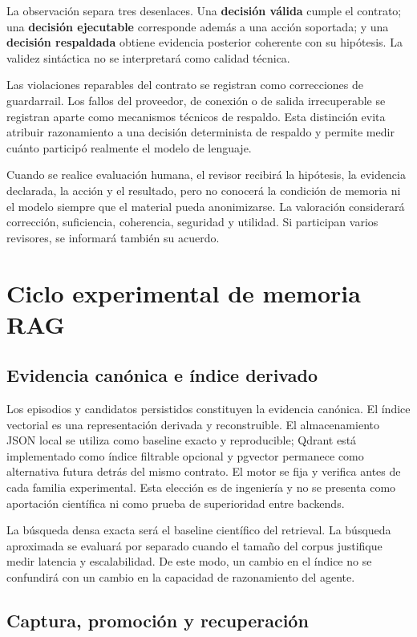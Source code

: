 La observación separa tres desenlaces. Una \textbf{decisión válida} cumple el
contrato; una \textbf{decisión ejecutable} corresponde además a una acción
soportada; y una \textbf{decisión respaldada} obtiene evidencia posterior
coherente con su hipótesis. La validez sintáctica no se interpretará como calidad
técnica.

Las violaciones reparables del contrato se registran como correcciones de
guardarrail. Los fallos del proveedor, de conexión o de salida irrecuperable se
        registran aparte como mecanismos técnicos de respaldo. Esta distinción evita atribuir
razonamiento a una decisión determinista de respaldo y permite medir cuánto
participó realmente el modelo de lenguaje.

Cuando se realice evaluación humana, el revisor recibirá la hipótesis, la
evidencia declarada, la acción y el resultado, pero no conocerá la condición de
memoria ni el modelo siempre que el material pueda anonimizarse. La valoración
considerará corrección, suficiencia, coherencia, seguridad y utilidad. Si
participan varios revisores, se informará también su acuerdo.

\section{Ciclo experimental de memoria RAG}

\subsection{Evidencia canónica e índice derivado}

Los episodios y candidatos persistidos constituyen la evidencia canónica. El
índice vectorial es una representación derivada y reconstruible. El
almacenamiento JSON local se utiliza como baseline exacto y reproducible;
Qdrant está implementado como índice filtrable opcional y pgvector permanece
como alternativa futura detrás del mismo contrato. El motor se fija y verifica
antes de cada familia experimental. Esta elección es de ingeniería y no se
presenta como aportación científica ni como prueba de superioridad entre
backends.

La búsqueda densa exacta será el baseline científico del retrieval. La búsqueda
aproximada se evaluará por separado cuando el tamaño del corpus justifique medir
latencia y escalabilidad. De este modo, un cambio en el índice no se confundirá
con un cambio en la capacidad de razonamiento del agente.

\subsection{Captura, promoción y recuperación}

